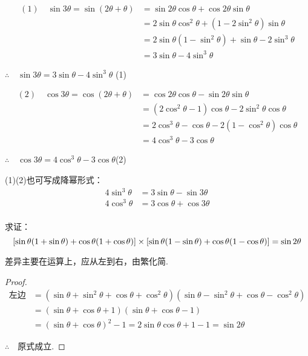 \begin{solution}
\[\begin{split}
    (1)\quad \sin3\theta =\sin(2\theta+\theta)&=\sin2\theta\cos\theta+\cos2\theta\sin\theta\\
&=2\sin\theta\cos^2\theta+(1-2\sin^2\theta)\sin\theta\\
&=2\sin\theta(1-\sin^2\theta)+\sin\theta-2\sin^3\theta\\&=3\sin\theta-4\sin^3\theta
    \end{split}\]

$\therefore\quad \sin3\theta =3\sin\theta-4\sin^3\theta$ \hfill(1)   

\[\begin{split}
(2)\quad \cos3\theta =\cos(2\theta+\theta)&=\cos2\theta\cos\theta-\sin2\theta\sin\theta\\
&=(2\cos^2\theta-1)\cos\theta-2\sin^2\theta\cos\theta\\
&=2\cos^3\theta-\cos\theta-2(1-\cos^2\theta)\cos\theta\\&=4\cos^3\theta-3\cos\theta
    \end{split}\]

$\therefore\quad \cos3\theta =4\cos^3\theta-3\cos\theta$\hfill(2)
\end{solution}

\begin{rmk}
    (1)(2)也可写成降幂形式：
\[\begin{split}
    4\sin^3\theta &=3\sin\theta-\sin3\theta\\
    4\cos^3\theta &=3\cos\theta+\cos3\theta\\
\end{split}\]
\end{rmk}

\begin{example}
求证：
\[[\sin\theta(1+\sin\theta)+\cos\theta(1+\cos\theta)]\times [\sin\theta(1-\sin\theta)+\cos\theta(1-\cos\theta)]=\sin2\theta\]
\end{example}

\begin{analyze}
差异主要在运算上，应从左到右，由繁化简.
\end{analyze}


\begin{proof}
\[\begin{split}
\text{左边}&=(\sin\theta+\sin^2\theta+\cos\theta+\cos^2\theta)(\sin\theta-\sin^2\theta+\cos\theta-\cos^2\theta)\\
&=(\sin\theta+\cos\theta+1)(\sin\theta+\cos\theta-1)\\
&=(\sin\theta+\cos\theta)^2-1 =2\sin\theta\cos\theta+1-1=\sin2\theta
\end{split}\]

$\therefore\quad $原式成立.
\end{proof}



